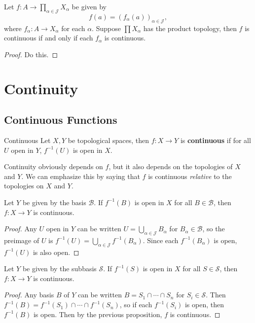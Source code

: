 \documentclass[10pt]{report}
\begin{document}
\begin{thrm}{}{}
	Let $f:A\to \prod_{\alpha\in\mathcal{J}}X_{\alpha}$ be given by \[f(a) = (f_{\alpha}(a))_{\alpha \in \mathcal{J}},\] where $f_{\alpha}:A\to X_{\alpha}$ for each $\alpha$. Suppose $\prod X_{\alpha}$ has the product topology, then $f$ is continuous if and only if each $f_{\alpha}$ is continuous.
\end{thrm}
\begin{proof}
{\color{red}Do this.}
\end{proof}




\chapter{Continuity}


\section{Continuous Functions}

\begin{defn}{Continuous}{}
	Let $X,Y$ be topological spaces, then $f : X \to Y$ is \textbf{continuous} if for all $U$ open in $Y$, $f^{-1}(U)$ is open in $X$.
\end{defn}

Continuity obviously depends on $f$, but it also depends on the topologies of $X$ and $Y$. We can emphasize this by saying that $f$ is continuous \textit{relative} to the topologies on  $X$ and $Y$.

\begin{prop}
	Let $Y$ be given by the basis $\mathcal{B}$. If $f^{-1}(B)$ is open in $X$ for all $B \in \mathcal{B}$, then $f: X \to Y$ is continuous.
\end{prop}
\begin{proof}
	Any $U$ open in $Y$ can be written $U = \bigcup_{\alpha\in\mathcal{J}} B_\alpha$ for $B_\alpha \in \mathcal{B}$, so the preimage of $U$ is $f^{-1}(U) = \bigcup_{\alpha\in\mathcal{J}} f^{-1}(B_\alpha)$. Since each $f^{-1}(B_\alpha)$ is open, $f^{-1}(U)$ is also open.
\end{proof}

\begin{prop}
	Let $Y$ be given by the subbasis $\mathcal{S}$. If $f^{-1}(S)$ is open in $X$ for all $S \in \mathcal{S}$, then $f: X \to Y$ is continuous.
\end{prop}
\begin{proof}
	Any basis $B$ of $Y$ can be written $B = S_1 \cap \cdots \cap S_n$ for $S_i \in \mathcal{S}$. Then $f^{-1}(B) = f^{-1}(S_1) \cap \cdots \cap f^{-1}(S_n)$, so if each $f^{-1}(S_i)$ is open, then $f^{-1}(B)$ is open. Then by the previous proposition, $f$ is continuous.
\end{proof}
\end{document}
